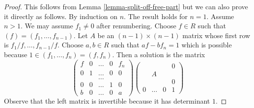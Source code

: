 \begin{proof}
This follows from Lemma \ref{lemma-split-off-free-part}
but we can also prove it directly as follows.
By induction on $n$. The result holds for $n = 1$. Assume $n > 1$.
We may assume $f_1 \not = 0$ after renumbering.
Choose $f \in R$ such that $(f) = (f_1, \ldots, f_{n - 1})$.
Let $A$ be an $(n - 1) \times (n - 1)$ matrix whose first row
is $f_1/f, \ldots, f_{n - 1}/f$. Choose $a, b \in R$ such that
$af - bf_n = 1$ which is possible because
$1 \in (f_1, \ldots, f_n) = (f, f_n)$. Then a solution is
the matrix
$$
\left(
\begin{matrix}
f & 0 & \ldots & 0 & f_n \\
0 & 1 & \ldots & 0 & 0 \\
  &   & \ldots \\
0 & 0 & \ldots & 1 & 0 \\
b & 0 & \ldots & 0 & a
\end{matrix}
\right)
\left(
\begin{matrix}
  & & & 0 \\
  & A \\
  & & & 0 \\
0 & \ldots & 0 & 1
\end{matrix}
\right)
$$
Observe that the left matrix is invertible because it has determinant $1$.
\end{proof}















